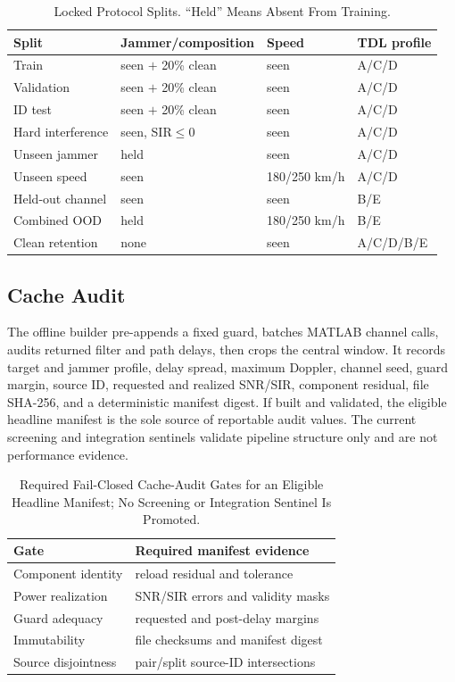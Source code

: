\documentclass[letterpaper,journal]{IEEEtran}
\begin{document}
\begin{table}[t]
\centering
\caption{Locked Protocol Splits.  ``Held'' Means Absent From Training.}
\label{tab:splits}
\footnotesize
\setlength{\tabcolsep}{3.2pt}
\begin{tabular}{llll}
\toprule
Split & Jammer/composition & Speed & TDL profile\\
\midrule
Train & seen $+$ 20\% clean & seen & A/C/D\\
Validation & seen $+$ 20\% clean & seen & A/C/D\\
ID test & seen $+$ 20\% clean & seen & A/C/D\\
Hard interference & seen, SIR$\leq0$ & seen & A/C/D\\
Unseen jammer & held & seen & A/C/D\\
Unseen speed & seen & 180/250 km/h & A/C/D\\
Held-out channel & seen & seen & B/E\\
Combined OOD & held & 180/250 km/h & B/E\\
Clean retention & none & seen & A/C/D/B/E\\
\bottomrule
\end{tabular}
\end{table}

\subsection{Cache Audit}
The offline builder pre-appends a fixed guard, batches MATLAB channel calls,
audits returned filter and path delays, then crops the central window.  It
records target and jammer profile, delay spread, maximum Doppler, channel
seed, guard margin, source ID, requested and realized SNR/SIR, component
residual, file SHA-256, and a deterministic manifest digest.
If built and validated, the eligible headline manifest is the sole source of
reportable audit values.  The current screening and integration sentinels
validate pipeline structure only and are not performance evidence.

\begin{table}[t]
\centering
\caption{Required Fail-Closed Cache-Audit Gates for an Eligible Headline
Manifest; No Screening or Integration Sentinel Is Promoted.}
\label{tab:cacheaudit}
\footnotesize
\begin{tabular}{ll}
\toprule
Gate & Required manifest evidence\\
\midrule
Component identity & reload residual and tolerance\\
Power realization & SNR/SIR errors and validity masks\\
Guard adequacy & requested and post-delay margins\\
Immutability & file checksums and manifest digest\\
Source disjointness & pair/split source-ID intersections\\
\bottomrule
\end{tabular}
\end{table}
\end{document}
